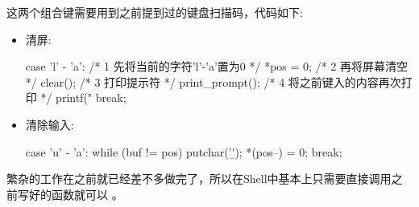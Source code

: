 这两个组合键需要用到之前提到过的键盘扫描码，代码如下:

\begin{itemize}
\item 清屏:
\begin{ccode}
	 case 'l' - 'a': 
	    /* 1 先将当前的字符'l'-'a'置为0 */
	    *pos = 0;
	    /* 2 再将屏幕清空 */
	    clear();
	    /* 3 打印提示符 */
	    print_prompt();
	    /* 4 将之前键入的内容再次打印 */
	    printf("%
	    break;
\end{ccode}
  
\item 清除输入:
\begin{ccode}
	 case 'u' - 'a':
	    while (buf != pos) {
	       putchar('\b');
	       *(pos--) = 0;
	    }
	    break;
\end{ccode}
\end{itemize}

繁杂的工作在之前就已经差不多做完了，所以在Shell中基本上只需要直接调用之前写好的函数就可以
。

